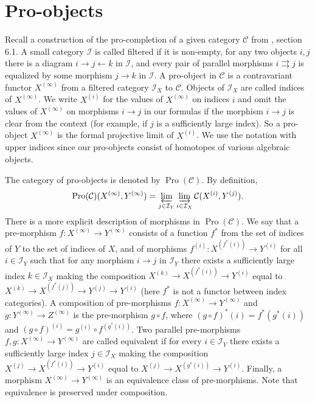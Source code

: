\documentclass{article}
\newcommand{\rar}{\rightarrow}
\newcommand{\lar}{\leftarrow}
\DeclareMathOperator{\Pro}{Pro}
\begin{document}
\section{Pro-objects}

Recall a construction of the pro-completion of a given category \(\mathcal C\) from \cite{}, section 6.1. A small category \(\mathcal I\) is called filtered if it is non-empty, for any two objects \(i, j\) there is a diagram \(i \rar j \lar k\) in \(\mathcal I\), and every pair of parallel morphisms \(i \rightrightarrows j\) is equalized by some morphism \(j \rar k\) in \(\mathcal I\). A pro-object in \(\mathcal C\) is a contravariant functor \(X^{(\infty)}\) from a filtered category \(\mathcal I_X\) to \(\mathcal C\). Objects of \(\mathcal I_X\) are called indices of \(X^{(\infty)}\). We write \(X^{(i)}\) for the values of \(X^{(\infty)}\) on indices \(i\) and omit the values of \(X^{(\infty)}\) on morphisms \(i \rar j\) in our formulas if the morphism \(i \rar j\) is clear from the context (for example, if \(j\) is a sufficiently large index). So a pro-object \(X^{(\infty)}\) is the formal projective limit of \(X^{(i)}\). We use the notation with upper indices since our pro-objects consist of homotopes of various algebraic objects.

The category of pro-objects is denoted by \(\Pro(\mathcal C)\). By definition,
\[
\Pro(\mathcal C)(X^{(\infty)}, Y^{(\infty)}) = \varprojlim_{j \in \mathcal I_Y} \varinjlim_{i \in \mathcal I_X} \mathcal C(X^{(i)}, Y^{(j)}).
\]
There is a more explicit description of morphisms in \(\Pro(\mathcal C)\). We say that a pre-morphism \(f \colon X^{(\infty)} \rar Y^{(\infty)}\) consists of a function \(f^*\) from the set of indices of \(Y\) to the set of indices of \(X\), and of morphisms \(f^{(i)} \colon X^{(f^*(i))} \rar Y^{(i)}\) for all \(i \in \mathcal I_Y\) such that for any morphism \(i \rar j\) in \(\mathcal I_Y\) there exists a sufficiently large index \(k \in \mathcal I_X\) making the composition \(X^{(k)} \rar X^{(f^*(i))} \rar Y^{(i)}\) equal to \(X^{(k)} \rar X^{(f^*(j))} \rar Y^{(j)} \rar Y^{(i)}\) (here \(f^*\) is not a functor between index categories). A composition of pre-morphisms \(f \colon X^{(\infty)} \rar Y^{(\infty)}\) and \(g \colon Y^{(\infty)} \rar Z^{(\infty)}\) is the pre-morphism \(g \circ f\), where \((g \circ f)^*(i) = f^*(g^*(i))\) and \((g \circ f)^{(i)} = g^{(i)} \circ f^{(g^*(i))}\). Two parallel pre-morphisms \(f, g \colon X^{(\infty)} \rar Y^{(\infty)}\) are called equivalent if for every \(i \in \mathcal I_Y\) there exists a sufficiently large index \(j \in \mathcal I_X\) making the composition \(X^{(j)} \rar X^{(f^*(i))} \rar Y^{(i)}\) equal to \(X^{(j)} \rar X^{(g^*(i))} \rar Y^{(i)}\). Finally, a morphism \(X^{(\infty)} \rar Y^{(\infty)}\) is an equivalence class of pre-morphisms. Note that equivalence is preserved under composition.
\end{document}
